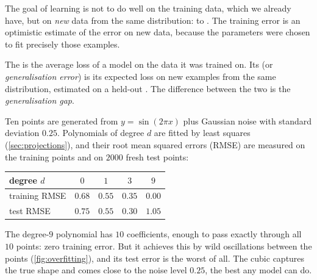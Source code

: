 The goal of learning is not to do well on the training data, which we already
have, but on \emph{new} data from the same distribution: to .
The training error is an optimistic estimate of the error on new data, because
the parameters were chosen to fit precisely those examples.

\begin{definition}\label{def:generalisation}
The  is the average loss of a model on the data it was
trained on. Its  (or \emph{generalisation error}) is its expected
loss on new examples from the same distribution, estimated on a held-out
. The difference between the two is the \emph{generalisation gap}.
\end{definition}

\begin{example}\label{ex:polynomial-overfitting}
Ten points are generated from $y = \sin(2\pi x)$ plus Gaussian noise with
standard deviation $0.25$. Polynomials of degree $d$ are fitted by least squares
(\cref{sec:projections}), and their root mean squared errors (RMSE) are measured on
the training points and on $2000$ fresh test points:
\begin{center}
\begin{tabular}{lcccc}
\toprule
degree $d$ & $0$ & $1$ & $3$ & $9$\\
\midrule
training RMSE & $0.68$ & $0.55$ & $0.35$ & $0.00$\\
test RMSE & $0.75$ & $0.55$ & $0.30$ & $1.05$\\
\bottomrule
\end{tabular}
\end{center}
The degree-$9$ polynomial has $10$ coefficients, enough to pass exactly through
all $10$ points: zero training error. But it achieves this by wild oscillations
between the points (\cref{fig:overfitting}), and its test error is the worst of
all. The cubic captures the true shape and comes close to the noise level $0.25$,
the best any model can do.
\end{example}

